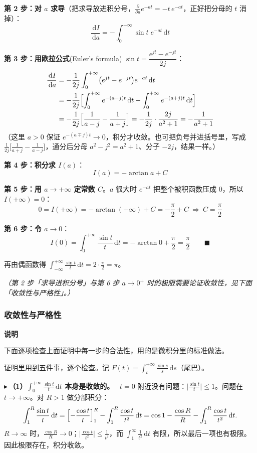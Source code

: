 \documentclass[UTF8,a4paper,11pt]{ctexart}
\newenvironment{note}{\begin{notebox}\textbf{说明}\par\smallskip}{\end{notebox}}
\renewcommand{\d}{\,\mathrm{d}}
\newcounter{ex}[section]
\newcommand{\point}[1]{\par\addvspace{1ex}\noindent\textcolor{ptteal}{$\blacktriangleright$\,\textbf{#1}}\ }
\renewcommand{\paragraph}[1]{\point{#1}}
\begin{document}
\textbf{第 2 步：对 $a$ 求导}（把求导放进积分号，$\frac{\partial}{\partial a}e^{-at}=-t\,e^{-at}$，正好把分母的 $t$ 消掉）：
\[
\frac{\d I}{\d a}=-\int_0^{+\infty}\sin t\;e^{-at}\d t
\]

\textbf{第 3 步：用欧拉公式}(Euler's formula) $\sin t=\dfrac{e^{jt}-e^{-jt}}{2j}$：
\begin{align*}
\frac{\d I}{\d a}
&=-\frac{1}{2j}\int_0^{+\infty}\bigl(e^{jt}-e^{-jt}\bigr)e^{-at}\d t\\
&=-\frac{1}{2j}\Bigl[\int_0^{+\infty}e^{-(a-j)t}\d t-\int_0^{+\infty}e^{-(a+j)t}\d t\Bigr]\\
&=-\frac{1}{2j}\Bigl[\frac{1}{a-j}-\frac{1}{a+j}\Bigr]
=-\frac{1}{2j}\cdot\frac{2j}{a^2+1}
=-\frac{1}{a^2+1}
\end{align*}
（这里 $a>0$ 保证 $e^{-(a\mp j)t}\to0$，积分才收敛。也可把负号并进括号里，写成 $\frac{1}{2j}\bigl[\frac{1}{a+j}-\frac{1}{a-j}\bigr]$，通分后分母 $a^2-j^2=a^2+1$、分子 $-2j$，结果一样。）

\textbf{第 4 步：积分求 $I(a)$}：
\[
I(a)=-\arctan a+C
\]

\textbf{第 5 步：用 $a\to+\infty$ 定常数 $C$}。$a$ 很大时 $e^{-at}$ 把整个被积函数压成 $0$，所以 $I(+\infty)=0$：
\[
0=I(+\infty)=-\arctan(+\infty)+C=-\frac{\pi}{2}+C\ \Longrightarrow\ C=\frac{\pi}{2}
\]

\textbf{第 6 步：令 $a\to 0$}：
\[
I(0)=\int_0^{+\infty}\frac{\sin t}{t}\d t=-\arctan 0+\frac{\pi}{2}=\frac{\pi}{2}\qquad\blacksquare
\]

再由偶函数得 $\int_{-\infty}^{+\infty}\frac{\sin t}{t}\d t=2\cdot\frac\pi2=\pi$。

\emph{（第 2 步「求导进积分号」与第 6 步 $a\to0^{+}$ 时的极限需要论证收敛性，见下面「收敛性与严格性」。）}

\subsubsection*{收敛性与严格性}
\begin{note}
下面逐项检查上面证明中每一步的合法性，用的是微积分里的标准做法。
\end{note}

证明里用到五件事，逐个检查。记 $F(t)=\displaystyle\int_t^{+\infty}\frac{\sin s}{s}\d s$（尾巴）。

\paragraph{（1）$\displaystyle\int_0^{+\infty}\frac{\sin t}{t}\d t$ 本身是收敛的。}
$t=0$ 附近没有问题：$\bigl|\frac{\sin t}{t}\bigr|\le1$。问题在 $t\to+\infty$。对 $R>1$ 做分部积分：
\[
\int_1^R\frac{\sin t}{t}\d t=\Bigl[-\frac{\cos t}{t}\Bigr]_1^R-\int_1^R\frac{\cos t}{t^2}\d t
=\cos1-\frac{\cos R}{R}-\int_1^R\frac{\cos t}{t^2}\d t .
\]
$R\to\infty$ 时，$\frac{\cos R}{R}\to0$；$\bigl|\frac{\cos t}{t^2}\bigr|\le\frac{1}{t^2}$，而 $\int_1^\infty\frac{1}{t^2}\d t$ 有限，所以最后一项也有极限。因此极限存在，积分收敛。
\end{document}
